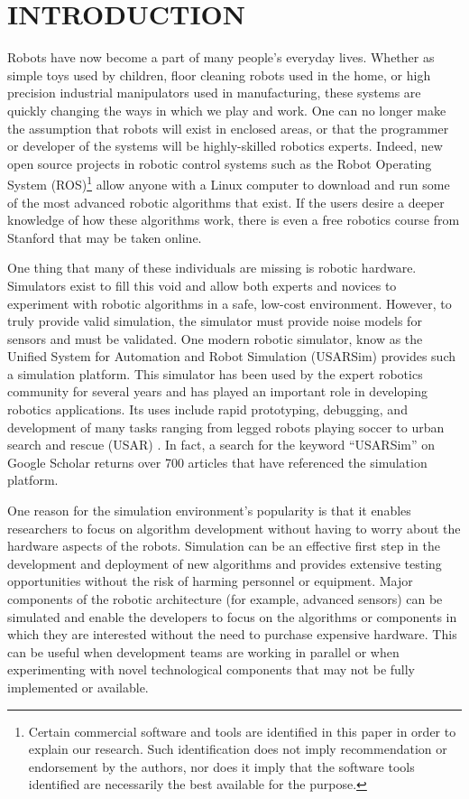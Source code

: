 \section*{INTRODUCTION}
Robots have now become a part of many people's everyday lives. Whether as simple toys used by children, floor cleaning robots used in the home, or high precision industrial manipulators used in manufacturing, these systems are quickly changing the ways in which we play and work. One can no longer make the assumption that robots will exist in enclosed areas, or that the programmer or developer of the systems will be highly-skilled robotics experts. Indeed, new open source projects in robotic control systems such as the Robot Operating System (ROS)\footnote{Certain commercial software and tools are identified in this paper in order to explain our research. Such identification does not imply recommendation or endorsement by the authors, nor does it imply that the software tools identified are necessarily the best available for the purpose.}\cite{ROSWeb} allow anyone with a Linux computer to download and run some of the most advanced robotic algorithms that exist. If the users desire a deeper knowledge of how these algorithms work, there is even a free robotics course from Stanford that may be taken online.

One thing that many of these individuals are missing is robotic hardware. Simulators exist to fill this void and allow both experts and novices to experiment with robotic algorithms in a safe, low-cost environment. However, to truly provide valid simulation, the simulator must provide noise models for sensors and must be validated. One modern robotic simulator, know as the Unified System for Automation and Robot Simulation (USARSim) \cite{USARSimWeb}  provides such a simulation platform. This simulator has been used by the expert robotics community for several years and has played an important role in developing robotics applications. Its uses include rapid prototyping, debugging, and development of many tasks ranging from legged robots playing soccer \cite{ZARATTI.LNAI.2007} to urban search and rescue (USAR) \cite{CARPIN.LNAI.2006,WANG.WSC.2003}. In fact, a search for the keyword ``USARSim'' on Google Scholar returns over 700 articles that have referenced the simulation platform.

One reason for the simulation environment's popularity is that it enables researchers to focus on algorithm development without having to worry about the hardware aspects of the robots. Simulation can be an effective first step in the development and deployment of new algorithms and provides extensive testing opportunities without the risk of harming personnel or equipment. Major components of the robotic architecture (for example, advanced sensors) can be simulated and enable the developers to focus on the algorithms or components in which they are interested without the need to purchase expensive hardware. This can be useful when development teams are working in parallel or when experimenting with novel technological components that may not be fully implemented or available.

